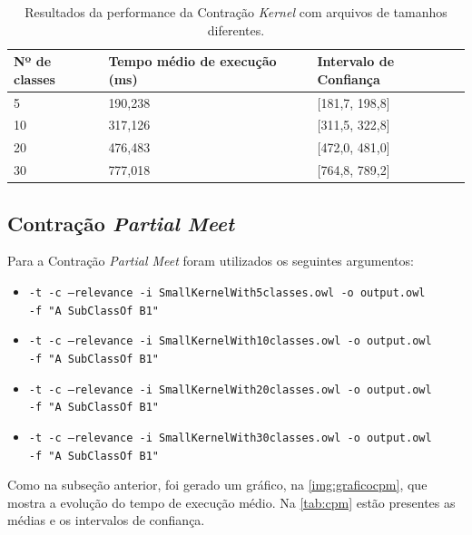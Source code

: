 \begin{table}[H]
	\centering
	\begin{tabular}{|l|l|l|}
		\hline
		\textbf{Nº de classes}  & \textbf{Tempo médio de execução (ms)} & \textbf{Intervalo de Confiança} \\ \hline
		5                                                 & 190,238                          & {[}181,7, 198,8{]}              \\ \hline
		10                                                & 317,126                          & {[}311,5, 322,8{]}              \\ \hline
		20                                                & 476,483                          & {[}472,0, 481,0{]}              \\ \hline
		30                                                & 777,018                          & {[}764,8, 789,2{]}              \\ \hline
	\end{tabular}
	\caption{Resultados da performance da Contração \textit{Kernel} com arquivos de tamanhos diferentes.}
	\label{tab:ck}
\end{table}

\subsection{Contração \textit{Partial Meet}}

Para a Contração \textit{Partial Meet} foram utilizados os seguintes argumentos:

\begin{itemize}
	\item \texttt{-t -c --relevance -i SmallKernelWith5classes.owl -o output.owl \\ -f "A SubClassOf B1"}
	\item \texttt{-t -c --relevance -i SmallKernelWith10classes.owl -o output.owl \\ -f "A SubClassOf B1"}
	\item \texttt{-t -c --relevance -i SmallKernelWith20classes.owl -o output.owl \\ -f "A SubClassOf B1"}
	\item \texttt{-t -c --relevance -i SmallKernelWith30classes.owl -o output.owl \\ -f "A SubClassOf B1"}
\end{itemize}

Como na subseção anterior, foi gerado um gráfico, na \autoref{img:graficocpm}, que mostra a evolução do tempo de execução médio. Na \autoref{tab:cpm} estão presentes as médias e os intervalos de confiança.

